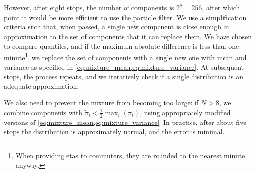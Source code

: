 However, after eight stops, the number of components is $2^8 = 256$, after which point it would be more efficient to use the particle filter. We use a simplification criteria such that, when passed, a single new component is close enough in approximation to the set of components that it can replace them. We have chosen to compare quantiles, and if the maximum absolute difference is less than one minute\footnote{When providing \glspl{eta} to commuters, they are rounded to the nearest minute, anyway.}, we replace the set of components with a single new one with mean and variance as specified in \cref{eq:mixture_mean,eq:mixture_variance}. At subsequent stops, the process repeats, and we iteratively check if a single distribution is an adequate approximation.


We also need to prevent the mixture from becoming too large: if $\tilde N > 8$, we combine components with $\tilde\pi_i < \frac{1}{2}\max_i(\pi_i)$, using appropriately modified versions of \cref{eq:mixture_mean,eq:mixture_variance}. In practice, after about five stops the distribution is approximately normal, and the error is minimal.

